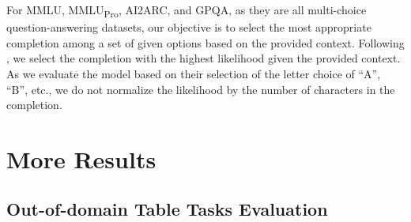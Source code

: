 \documentclass[11pt]{article}
\begin{document}
For MMLU, MMLU\textsubscript{Pro}, AI2ARC, and GPQA, as they are all multi-choice question-answering datasets, our objective is to select the most appropriate completion among a set of given options based on the provided context. 
Following \citet{touvron2023llama}, we select the completion with the highest likelihood given the provided context. 
As we evaluate the model based on their selection of the letter choice of ``A'', ``B'', etc., we do not normalize the likelihood by the number of characters in the completion.


\section{More Results}
\label{app-sec: more-results}


\subsection{Out-of-domain Table Tasks Evaluation}

    
    


\end{document}
